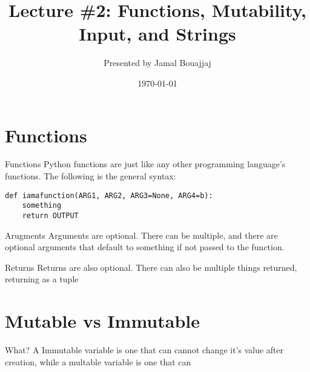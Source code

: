 %
%



\title{Lecture \#2: Functions, Mutability, Input, and Strings}
\date{\today}
\author{Presented by Jamal Bouajjaj}



\maketitle

\section{Functions}
\begin{frame}[containsverbatim]{Functions}
    Python functions are just like any other programming language's functions. The following is the general syntax:

    \begin{verbatim}
def iamafunction(ARG1, ARG2, ARG3=None, ARG4=b):
    something
    return OUTPUT
    \end{verbatim}
\end{frame}

\begin{frame}{Arugments}
    Arguments are optional. There can be multiple, and there are optional arguments that default to something if not passed to the function.
\end{frame}

\begin{frame}{Returns}
    Returns are also optional. There can also be multiple things returned, returning as a tuple
\end{frame}

\section{Mutable vs Immutable}
\begin{frame}[containsverbatim]{What?}
    A Immutable variable is one that can cannot change it's value after creation, while a multable variable is one that can
\end{frame}

